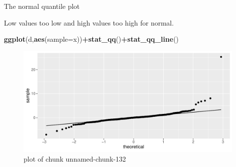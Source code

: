 \documentclass[ignorenonframetext,]{beamer}
\newenvironment{Shaded}{\begin{snugshade}}{\end{snugshade}}
\newcommand{\DataTypeTok}[1]{\textcolor[rgb]{0.13,0.29,0.53}{#1}}
\newcommand{\KeywordTok}[1]{\textcolor[rgb]{0.13,0.29,0.53}{\textbf{#1}}}
\newcommand{\NormalTok}[1]{#1}
\newcommand{\OperatorTok}[1]{\textcolor[rgb]{0.81,0.36,0.00}{\textbf{#1}}}
\begin{document}
\begin{frame}[fragile]{The normal quantile plot}
\protect\hypertarget{the-normal-quantile-plot-5}{}

Low values too low and high values too high for normal.

\begin{Shaded}
\begin{Highlighting}[]
\KeywordTok{ggplot}\NormalTok{(d,}\KeywordTok{aes}\NormalTok{(}\DataTypeTok{sample=}\NormalTok{x))}\OperatorTok{+}\KeywordTok{stat_qq}\NormalTok{()}\OperatorTok{+}\KeywordTok{stat_qq_line}\NormalTok{()}
\end{Highlighting}
\end{Shaded}

\begin{figure}
\centering
\includegraphics{figure/unnamed-chunk-132-1.pdf}
\caption{plot of chunk unnamed-chunk-132}
\end{figure}

\end{frame}
\end{document}
